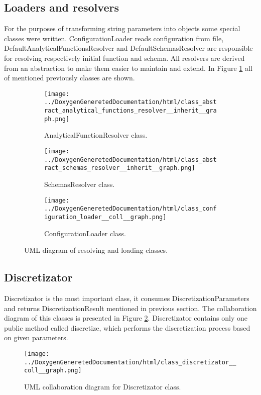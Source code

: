 	\subsection{Loaders and resolvers}	
		For the purposes of transforming string parameters into objects some special classes were written. ConfigurationLoader reads configuration from file, DefaultAnalyticalFunctionsResolver and DefaultSchemasResolver are responsible for resolving respectively initial function and schema. All resolvers are derived from an abstraction to make them easier to maintain and extend. In Figure \ref{fig:resolvers} all of mentioned previously classes are shown.
		\begin{figure}[!hbtp]
			\begin{subfigure}[t]{0.33\textwidth}
				\centering
				\texttt{[image: ../DoxygenGeneretedDocumentation/html/class\_abstract\_analytical\_functions\_resolver\_\_inherit\_\_graph.png]}
				\caption{AnalyticalFunctionResolver class.}
			\end{subfigure}
			\begin{subfigure}[t]{0.33\textwidth}
				\centering
				\texttt{[image: ../DoxygenGeneretedDocumentation/html/class\_abstract\_schemas\_resolver\_\_inherit\_\_graph.png]}
				\caption{SchemasResolver class.}
			\end{subfigure}
			\begin{subfigure}[t]{0.33\textwidth}
				\centering
				\texttt{[image: ../DoxygenGeneretedDocumentation/html/class\_configuration\_loader\_\_coll\_\_graph.png]}
				\caption{ConfigurationLoader class.}
			\end{subfigure}
			\caption{UML diagram of resolving and loading classes.}
			\label{fig:resolvers}
		\end{figure}
		
	\subsection{Discretizator}
		Discretizator is the most important class, it consumes DiscretizationParameters and returns DiscretizationResult mentioned in previous section. The collaboration diagram of this classes is presented in Figure \ref{fig:discretizator}. Discretizator contains only one public method called discretize, which performs the discretization process based on given parameters.
		\begin{figure}[!hbtp]
				\centering
				\texttt{[image: ../DoxygenGeneretedDocumentation/html/class\_discretizator\_\_coll\_\_graph.png]}
			\caption{UML collaboration diagram for Discretizator class.}
			\label{fig:discretizator}
		\end{figure}
	

